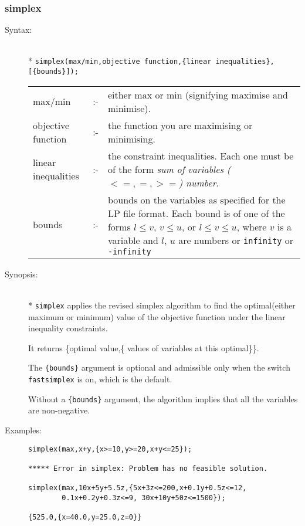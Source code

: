 \subsubsection{simplex}
\label{linalg:simplex}

\begin{description}
\item[Syntax:]\mbox{}\\*
\texttt{simplex(max/min,objective function,\{linear
inequalities\},[\{bounds\}]);}\\[2mm]
\begin{tabular}{l l p{.63\linewidth}}
  max/min             & :- & either max or min
    (signifying maximise and minimise). \\
  objective function  & :- & the function you are maximising or
  minimising. \\
  linear inequalities & :- & the constraint
    inequalities. Each one must be of the form
    \textit{sum of variables ($<=,=,>=$) number}.\\
  bounds & :- & bounds on the variables as
    specified for the LP file format. Each bound is of one of the forms $l\leq
    v$, $v\leq u$, or $l\leq v\leq u$, where $v$ is a variable and $l$, $u$ are
    numbers or \texttt{infinity} or \texttt{-infinity}
\end{tabular}

\item[Synopsis:]\mbox{}\\*
\texttt{simplex} applies the revised simplex algorithm to find the
optimal(either maximum or minimum) value of the objective function
under the linear inequality constraints.

It returns \{optimal value,\{ values of variables at this optimal\}\}.

The \texttt{\{bounds\}} argument is optional and admissible only when the switch
\texttt{fastsimplex} is on, which is the default.

Without a \texttt{\{bounds\}} argument, the algorithm implies that all the
variables are non-negative.

\item[Examples:]
\begin{verbatim}
simplex(max,x+y,{x>=10,y>=20,x+y<=25});

***** Error in simplex: Problem has no feasible solution.

simplex(max,10x+5y+5.5z,{5x+3z<=200,x+0.1y+0.5z<=12,
        0.1x+0.2y+0.3z<=9, 30x+10y+50z<=1500});

{525.0,{x=40.0,y=25.0,z=0}}
\end{verbatim}
\end{description}


